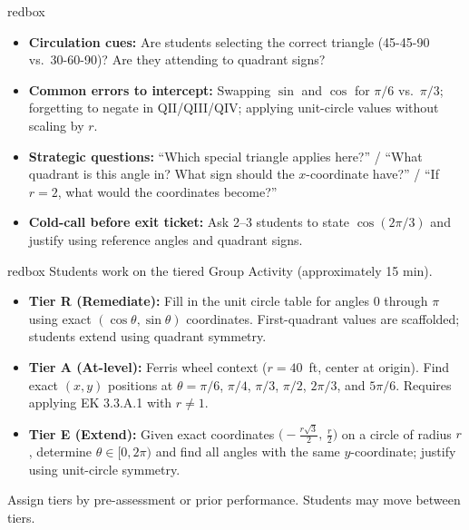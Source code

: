 \documentclass[10pt]{article}
\begin{document}
\begin{skillbox}{redbox}
\begin{itemize}
  \item \textbf{Circulation cues:} Are students selecting the correct triangle (45-45-90 vs.\ 30-60-90)? Are they attending to quadrant signs?
  \item \textbf{Common errors to intercept:} Swapping $\sin$ and $\cos$ for $\pi/6$ vs.\ $\pi/3$; forgetting to negate in QII/QIII/QIV; applying unit-circle values without scaling by $r$.
  \item \textbf{Strategic questions:} ``Which special triangle applies here?'' / ``What quadrant is this angle in? What sign should the $x$-coordinate have?'' / ``If $r = 2$, what would the coordinates become?''
  \item \textbf{Cold-call before exit ticket:} Ask 2--3 students to state $\cos(2\pi/3)$ and justify using reference angles and quadrant signs.
\end{itemize}
\end{skillbox}
\vspace{6pt}

\begin{skillbox}{redbox}
Students work on the tiered Group Activity (approximately 15 min).

\begin{itemize}
  \item \textbf{Tier R (Remediate):} Fill in the unit circle table for angles $0$ through $\pi$ using exact $(\cos\theta, \sin\theta)$ coordinates. First-quadrant values are scaffolded; students extend using quadrant symmetry.
  \item \textbf{Tier A (At-level):} Ferris wheel context ($r = 40$~ft, center at origin). Find exact $(x, y)$ positions at $\theta = \pi/6$, $\pi/4$, $\pi/3$, $\pi/2$, $2\pi/3$, and $5\pi/6$. Requires applying EK 3.3.A.1 with $r \ne 1$.
  \item \textbf{Tier E (Extend):} Given exact coordinates $\bigl(-\tfrac{r\sqrt{3}}{2},\, \tfrac{r}{2}\bigr)$ on a circle of radius $r$, determine $\theta \in [0, 2\pi)$ and find all angles with the same $y$-coordinate; justify using unit-circle symmetry.
\end{itemize}

Assign tiers by pre-assessment or prior performance. Students may move between tiers.
\end{skillbox}
\vspace{6pt}
\end{document}

